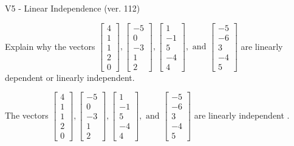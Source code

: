 \begin{exercise}
  \begin{exerciseTitle}V5 - Linear Independence (ver. 112)\end{exerciseTitle}
  \begin{exerciseStatement}
    Explain why the vectors \(\left[\begin{array}{r}
4 \\
1 \\
1 \\
2 \\
0
\end{array}\right] , \left[\begin{array}{r}
-5 \\
0 \\
-3 \\
1 \\
2
\end{array}\right] , \left[\begin{array}{r}
1 \\
-1 \\
5 \\
-4 \\
4
\end{array}\right] , \text{ and } \left[\begin{array}{r}
-5 \\
-6 \\
3 \\
-4 \\
5
\end{array}\right]\) are linearly dependent or linearly independent.	


  \end{exerciseStatement}
  \begin{exerciseAnswer}
   The vectors \(\left[\begin{array}{r}
4 \\
1 \\
1 \\
2 \\
0
\end{array}\right] , \left[\begin{array}{r}
-5 \\
0 \\
-3 \\
1 \\
2
\end{array}\right] , \left[\begin{array}{r}
1 \\
-1 \\
5 \\
-4 \\
4
\end{array}\right] , \text{ and } \left[\begin{array}{r}
-5 \\
-6 \\
3 \\
-4 \\
5
\end{array}\right]\) are 
  	 linearly independent  .
  


  \end{exerciseAnswer}
\end{exercise}